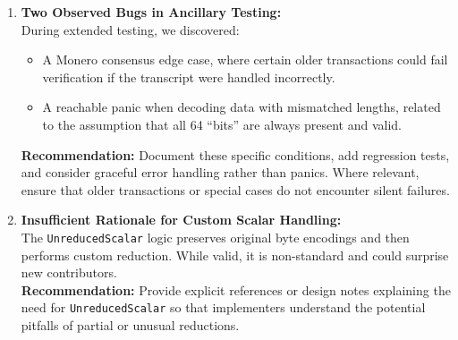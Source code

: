 \documentclass[12pt,a4paper]{article}
\begin{document}
\begin{enumerate}
    \item \textbf{Two Observed Bugs in Ancillary Testing:}\\
    During extended testing, we discovered:
    \begin{itemize}
      \item A Monero consensus edge case, where certain older transactions could fail verification if the transcript were handled incorrectly.
      \item A reachable panic when decoding data with mismatched lengths, related to the assumption that all 64 “bits” are always present and valid.
    \end{itemize}
    \textbf{Recommendation:} Document these specific conditions, add regression tests, and consider graceful error handling rather than panics. Where relevant, ensure that older transactions or special cases do not encounter silent failures.

    \item \textbf{Insufficient Rationale for Custom Scalar Handling:}\\
    The \texttt{UnreducedScalar} logic preserves original byte encodings and then performs custom reduction. While valid, it is non-standard and could surprise new contributors.\\
    \textbf{Recommendation:} Provide explicit references or design notes explaining the need for \texttt{UnreducedScalar} so that implementers understand the potential pitfalls of partial or unusual reductions.
\end{enumerate}



\end{document}
